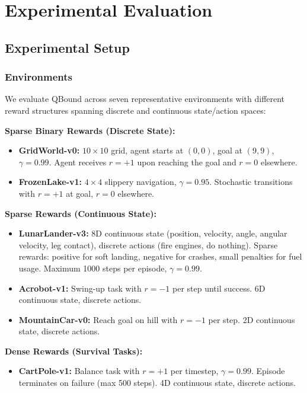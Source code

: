 \documentclass[11pt]{article}
\theoremstyle{definition}
\theoremstyle{remark}
\begin{document}
\section{Experimental Evaluation}
\label{sec:experiments}

\subsection{Experimental Setup}

\subsubsection{Environments}

We evaluate QBound across seven representative environments with different reward structures spanning discrete and continuous state/action spaces:

\textbf{Sparse Binary Rewards (Discrete State):}
\begin{itemize}
    \item \textbf{GridWorld-v0:} $10 \times 10$ grid, agent starts at $(0,0)$, goal at $(9,9)$, $\gamma = 0.99$. Agent receives $r=+1$ upon reaching the goal and $r=0$ elsewhere.
    \item \textbf{FrozenLake-v1:} $4 \times 4$ slippery navigation, $\gamma = 0.95$. Stochastic transitions with $r=+1$ at goal, $r=0$ elsewhere.
\end{itemize}

\textbf{Sparse Rewards (Continuous State):}
\begin{itemize}
    \item \textbf{LunarLander-v3:} 8D continuous state (position, velocity, angle, angular velocity, leg contact), discrete actions (fire engines, do nothing). Sparse rewards: positive for soft landing, negative for crashes, small penalties for fuel usage. Maximum 1000 steps per episode, $\gamma = 0.99$.
    \item \textbf{Acrobot-v1:} Swing-up task with $r=-1$ per step until success. 6D continuous state, discrete actions.
    \item \textbf{MountainCar-v0:} Reach goal on hill with $r=-1$ per step. 2D continuous state, discrete actions.
\end{itemize}

\textbf{Dense Rewards (Survival Tasks):}
\begin{itemize}
    \item \textbf{CartPole-v1:} Balance task with $r = +1$ per timestep, $\gamma = 0.99$. Episode terminates on failure (max 500 steps). 4D continuous state, discrete actions.
\end{itemize}
\end{document}
